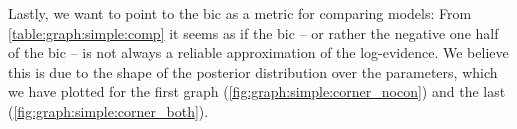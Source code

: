 \documentclass[\relativeRoot/main.tex]{subfiles}
\begin{document}
Lastly, we want to point to the \gls{bic} as a metric for comparing models: From \cref{table:graph:simple:comp} it seems as if the \gls{bic} -- or rather the negative one half of the \gls{bic} -- is not always a reliable approximation of the log-evidence. We believe this is due to the shape of the posterior distribution over the parameters, which we have plotted for the first graph (\cref{fig:graph:simple:corner_nocon}) and the last (\cref{fig:graph:simple:corner_both}).
\end{document}
